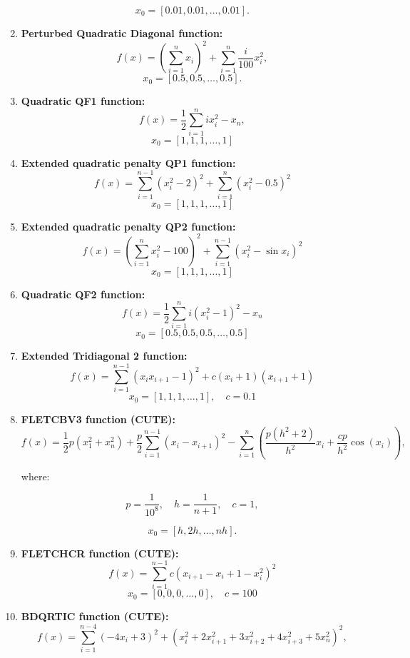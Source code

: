 \documentclass[10pt]{article}
\begin{document}
\begin{enumerate}
    \[
    x_0 = [0.01, 0.01, \ldots, 0.01].
    \]

    \item \textbf{Perturbed Quadratic Diagonal function:}
    \[
    f(x) = \left(\sum_{i=1}^{n}  x_i\right)^2 + \sum_{i=1}^n \frac{i}{100} x_i^2,
    \]
    \[
    x_0 = [0.5, 0.5, \dots, 0.5].
    \]

    \item \textbf{Quadratic QF1 function:}
    \[
    f(x) = \frac{1}{2} \sum_{i=1}^{n} i x_i^2 - x_n,
    \]
    \[
    x_0 = [1, 1, 1, \dots, 1]
    \]

    \item \textbf{Extended quadratic penalty QP1 function:}
    \[
    f(x) = \sum_{i=1}^{n-1} \left(x_i^2 - 2\right)^2 + \sum_{i=1}^{n} \left(x_i^2 - 0.5\right)^2
    \]
    \[
    x_0 = [1, 1, 1, \dots, 1]
    \]

    \item \textbf{Extended quadratic penalty QP2 function:}
    \[
    f(x) =\left( \sum_{i=1}^{n} x_i^2 - 100\right)^2 + \sum_{i=1}^{n-1} \left(x_i^2 - \sin x_i \right)^2
    \]
    \[
    x_0 = [1, 1, 1, \dots, 1]
    \]

    \item \textbf{Quadratic QF2 function:}
    \[
    f(x) =  \frac{1}{2} \sum_{i=1}^{n} i\left( x_i^2 - 1\right)^2 - x_n
    \]
    \[
    x_0 = [0.5, 0.5, 0.5, \dots, 0.5]
    \]

    \item \textbf{Extended Tridiagonal 2 function:}
    \[
    f(x) = \sum_{i=1}^{n-1}(x_ix_{i+1} - 1)^2 + c(x_i + 1)(x_{i+1} + 1)
    \]
    \[
    x_0 = [1, 1, 1, \dots, 1], \quad c = 0.1
    \]

    \item \textbf{FLETCBV3 function (CUTE):}
    \[
    f(x) = \frac{1}{2}p(x_1^2 + x_n^2) + \frac{p}{2}\sum_{i=1}^{n-1} (x_i - x_{i+1})^2 - \sum_{i=1}^{n} \left( \frac{p(h^2 + 2)}{h^2} x_i + \frac{c p}{h^2} \cos(x_i) \right),
    \]

    where:

    \[
    p = \frac{1}{10^8}, \quad h = \frac{1}{n + 1}, \quad c = 1,
    \]

    \[
    x_0 = [h, 2h, \ldots, n h].
    \]

    \item \textbf{FLETCHCR function (CUTE):}
    \[
    f(x) = \sum_{i=1}^{n-1}  c (x_{i+1} - x_i + 1 - x_i^2)^2 
    \]
    \[
    x_0 = [0, 0, 0, \dots, 0], \quad c = 100
    \]

    \item \textbf{BDQRTIC function (CUTE):}
    \[
    f(x) = \sum_{i=1}^{n-4} (-4 x_i + 3)^2 + \left( x_i^2 + 2 x_{i+1}^2 + 3 x_{i+2}^2 + 4 x_{i+3}^2 + 5 x_n^2 \right)^2,
    \]


\end{enumerate}
\end{document}
